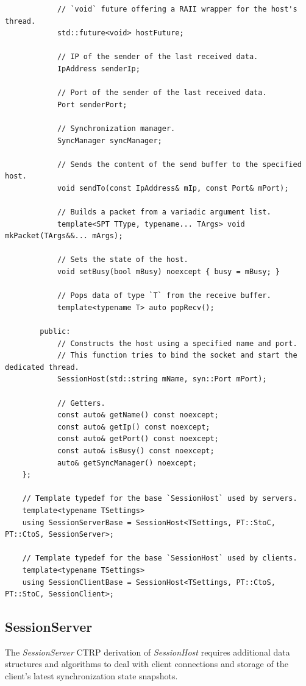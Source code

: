 \documentclass{report}
\begin{document}
\begin{verbatim}
            // `void` future offering a RAII wrapper for the host's thread.
            std::future<void> hostFuture;

            // IP of the sender of the last received data.
            IpAddress senderIp;
            
            // Port of the sender of the last received data.
            Port senderPort;
            
            // Synchronization manager.
            SyncManager syncManager;

            // Sends the content of the send buffer to the specified host.
            void sendTo(const IpAddress& mIp, const Port& mPort);

            // Builds a packet from a variadic argument list.
            template<SPT TType, typename... TArgs> void mkPacket(TArgs&&... mArgs);

            // Sets the state of the host.
            void setBusy(bool mBusy) noexcept { busy = mBusy; }

            // Pops data of type `T` from the receive buffer.
            template<typename T> auto popRecv();

        public:
            // Constructs the host using a specified name and port.
            // This function tries to bind the socket and start the dedicated thread.
            SessionHost(std::string mName, syn::Port mPort);

            // Getters.
            const auto& getName() const noexcept;
            const auto& getIp() const noexcept;
            const auto& getPort() const noexcept;
            const auto& isBusy() const noexcept;
            auto& getSyncManager() noexcept;
    };

    // Template typedef for the base `SessionHost` used by servers.
    template<typename TSettings> 
    using SessionServerBase = SessionHost<TSettings, PT::StoC, PT::CtoS, SessionServer>;

    // Template typedef for the base `SessionHost` used by clients.
    template<typename TSettings> 
    using SessionClientBase = SessionHost<TSettings, PT::CtoS, PT::StoC, SessionClient>;
\end{verbatim}

            \subsection{SessionServer}

                The \emph{SessionServer} CTRP derivation of \emph{SessionHost} requires additional data structures and algorithms to deal with client connections and storage of the client's latest synchronization state snapshots.
\end{document}
